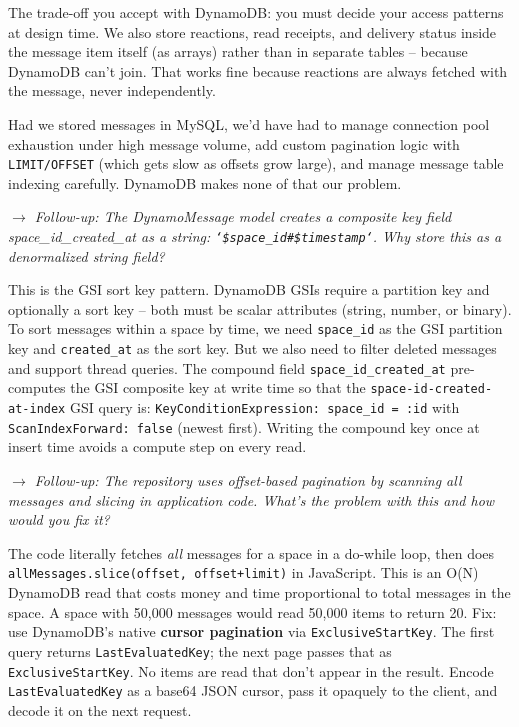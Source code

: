 \documentclass[letterpaper,10pt]{article}
\newcommand{\followup}[1]{\smallskip\noindent\textit{\textcolor{nordblue}{$\rightarrow$ Follow-up: #1}}\smallskip}
\begin{document}
The trade-off you accept with DynamoDB: you must decide your access patterns at design time. We also store reactions, read receipts, and delivery status inside the message item itself (as arrays) rather than in separate tables -- because DynamoDB can't join. That works fine because reactions are always fetched with the message, never independently.

Had we stored messages in MySQL, we'd have had to manage connection pool exhaustion under high message volume, add custom pagination logic with \texttt{LIMIT/OFFSET} (which gets slow as offsets grow large), and manage message table indexing carefully. DynamoDB makes none of that our problem.

\followup{The DynamoMessage model creates a composite key field space\_id\_created\_at as a string: \texttt{`\${space\_id}\#\${timestamp}`}. Why store this as a denormalized string field?}

\noindent This is the GSI sort key pattern. DynamoDB GSIs require a partition key and optionally a sort key -- both must be scalar attributes (string, number, or binary). To sort messages within a space by time, we need \texttt{space\_id} as the GSI partition key and \texttt{created\_at} as the sort key. But we also need to filter deleted messages and support thread queries. The compound field \texttt{space\_id\_created\_at} pre-computes the GSI composite key at write time so that the \texttt{space-id-created-at-index} GSI query is: \texttt{KeyConditionExpression: space\_id = :id} with \texttt{ScanIndexForward: false} (newest first). Writing the compound key once at insert time avoids a compute step on every read.

\followup{The repository uses offset-based pagination by scanning all messages and slicing in application code. What's the problem with this and how would you fix it?}

\noindent The code literally fetches \textit{all} messages for a space in a do-while loop, then does \texttt{allMessages.slice(offset, offset+limit)} in JavaScript. This is an O(N) DynamoDB read that costs money and time proportional to total messages in the space. A space with 50,000 messages would read 50,000 items to return 20. Fix: use DynamoDB's native \textbf{cursor pagination} via \texttt{ExclusiveStartKey}. The first query returns \texttt{LastEvaluatedKey}; the next page passes that as \texttt{ExclusiveStartKey}. No items are read that don't appear in the result. Encode \texttt{LastEvaluatedKey} as a base64 JSON cursor, pass it opaquely to the client, and decode it on the next request.
\end{document}
